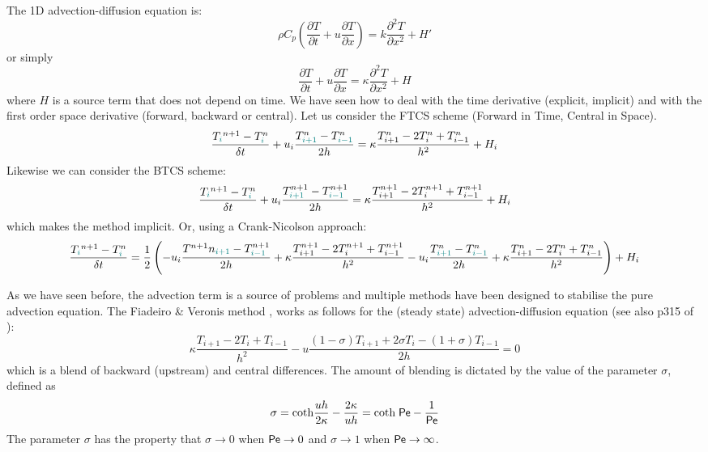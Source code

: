 The 1D advection-diffusion equation is:
\begin{equation}
\rho C_p \left( \frac{\partial T}{\partial t}  
+ u \frac{\partial T}{\partial x} \right)= k \frac{\partial^2 T}{\partial x^2} + H'
\end{equation}
or simply
\begin{equation}
\frac{\partial T}{\partial t} + u \frac{\partial T}{\partial x}= \kappa \frac{\partial^2 T}{\partial x^2} + H
\end{equation}
where $H$ is a source term that does not depend on time.
We have seen how to deal with the time derivative (explicit, implicit) 
and with the first order space derivative (forward, backward or central).
Let us consider the FTCS scheme (Forward in Time, Central in Space).
\[
\frac{T_{\color{teal}i}^{n+1}-T^n_{\color{teal}i}}{\delta t} 
+ u_i \frac{T^n_{\color{teal}i+1} - T^n_{{\color{teal}i-1}}}{2h} = \kappa \frac{T_{i+1}^n-2T_i^n+T_{i-1}^n}{h^2} + H_i
\]
Likewise we can consider the BTCS scheme:
\[
\frac{T_{\color{teal}i}^{n+1}-T^n_{\color{teal}i}}{\delta t} 
+ u_i \frac{T^{n+1}_{\color{teal}i+1} - T^{n+1}_{{\color{teal}i-1}}}{2h} 
= \kappa \frac{T_{i+1}^{n+1}-2T_i^{n+1}+T_{i-1}^{n+1}}{h^2} + H_i
\]
which makes the method implicit. 
Or, using a Crank-Nicolson approach:
\[
\frac{T_{\color{teal}i}^{n+1}-T^n_{\color{teal}i}}{\delta t} 
=
\frac12
\left(
- u_i \frac{T^{n+1}n_{\color{teal}i+1} - T^{n+1}_{{\color{teal}i-1}}}{2h} 
+ \kappa \frac{T_{i+1}^{n+1}-2T_i^{n+1}+T_{i-1}^{n+1}}{h^2} 
- u_i \frac{T^n_{\color{teal}i+1} - T^n_{{\color{teal}i-1}}}{2h} + \kappa \frac{T_{i+1}^n-2T_i^n+T_{i-1}^n}{h^2} 
\right)
+ H_i
\]




As we have seen before, the advection term is a source of problems and multiple 
methods have been designed to stabilise the pure advection equation. 
The {\color{olive}Fiadeiro \& Veronis method} \cite{five77,wrig92}, works as follows for the (steady state)
advection-diffusion equation (see also p315 of \textcite{boudreau}):
\[
\kappa \frac{T_{i+1}-2T_i + T_{i-1}}{h^2}
- u \frac{(1-\sigma) T_{i+1}+2\sigma T_i -(1+\sigma)T_{i-1}}{2 h} = 0
\]
which is a blend of backward (upstream) and central differences. The amount of
blending is dictated by the value of the parameter $\sigma$, defined as
\[
\sigma 
= \text{coth} \frac{u h}{2 \kappa} - \frac{2 \kappa}{u h}
= \text{coth} \; {\mathsf{Pe}}  - \frac{1}{{\mathsf{Pe}}}
\]
The parameter $\sigma$ has the property that
$\sigma \rightarrow 0$ when ${\mathsf{Pe}} \rightarrow 0$ and 
$\sigma \rightarrow 1$ when ${\mathsf{Pe}} \rightarrow \infty$.

